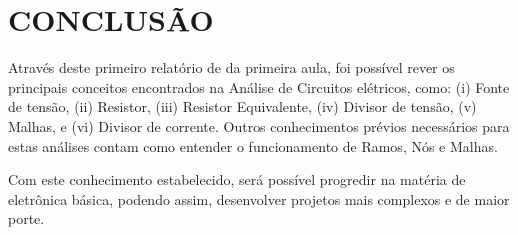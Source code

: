 \chapter{CONCLUSÃO}

Através deste primeiro relatório de da primeira aula, foi possível rever os principais conceitos encontrados na Análise de Circuitos elétricos, como: (i) Fonte de tensão, (ii) Resistor, (iii) Resistor Equivalente, (iv) Divisor de tensão, (v) Malhas, e (vi) Divisor de corrente. Outros conhecimentos prévios necessários para estas análises contam como entender o funcionamento de Ramos, Nós e Malhas.

Com este conhecimento estabelecido, será possível progredir na matéria de eletrônica básica, podendo assim, desenvolver projetos mais complexos e de maior porte.
